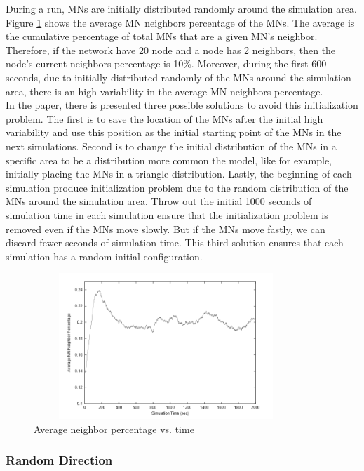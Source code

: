 During a run, MNs are initially distributed randomly around the simulation area. Figure \ref{RandomWaypointFig2} shows the average MN neighbors percentage of the MNs. The average is the cumulative percentage of total MNs that are a given MN's neighbor. Therefore, if the network have 20 node and a node has 2 neighbors, then the node's current neighbors percentage is 10\%. Moreover, during the first 600 seconds, due to initially distributed randomly of the MNs around the simulation area, there is an high variability in the average MN neighbors percentage.\\
In the paper, there is presented three possible solutions to avoid this initialization problem. The first is to save the location of the MNs after the initial high variability and use this position as the initial starting point of the MNs in the next simulations. Second is to change the initial distribution of the MNs in a specific area to be a distribution more common the model, like for example, initially placing the MNs in a triangle distribution. Lastly, the beginning of each simulation produce initialization problem due to the random distribution of the MNs around the simulation area. Throw out the initial 1000 seconds of simulation time in each simulation ensure that the initialization problem is removed even if the MNs move slowly. But if the MNs move fastly, we can discard fewer seconds of simulation time. This third solution ensures that each simulation has a random initial configuration.\\

\begin{figure}[h]
\center
\includegraphics[width=10cm,height=55mm]{../images/randomwaypoint2.png}
\caption{\label{RandomWaypointFig2}Average neighbor percentage vs. time}
\end{figure}

\newpage
\subsubsection{Random Direction}

